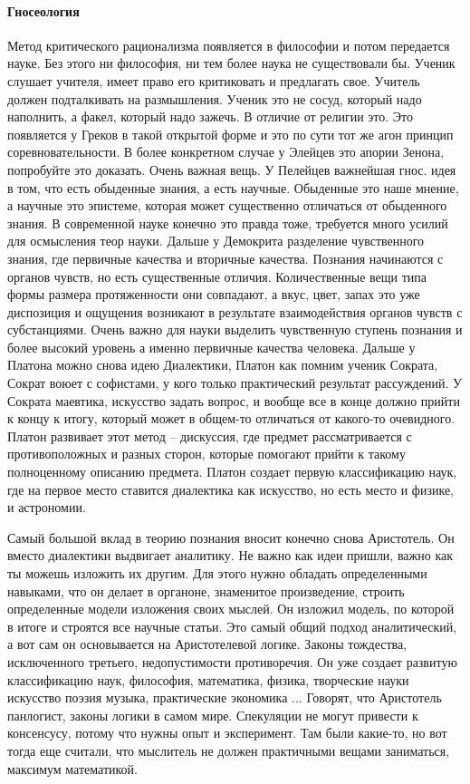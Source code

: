 \documentclass[a4paper, 12pt]{article}
\begin{document}
\paragraph{Гносеология}
Метод критического рационализма появляется в философии и потом 
передается науке. Без этого ни философия, ни тем более наука не 
существовали бы. Ученик слушает учителя, имеет право его критиковать 
и предлагать свое. Учитель должен подталкивать на размышления. Ученик 
это не сосуд, который надо наполнить, а факел, который надо зажечь. 
В отличие от религии это. Это появляется у Греков в такой открытой форме 
и это по сути тот же агон принцип соревновательности. В более конкретном 
случае у Элейцев это апории Зенона, попробуйте это доказать. Очень 
важная вещь. У Пелейцев важнейшая гнос. идея в том, что есть обыденные 
знания, а есть научные. Обыденные это наше мнение, а научные это 
эпистеме, которая может существенно отличаться от обыденного знания. 
В современной науке конечно это правда тоже, требуется много усилий для 
осмысления теор науки. Дальше у Демокрита разделение чувственного 
знания, где первичные качества и вторичные качества. Познания начинаются 
с органов чувств, но есть существенные отличия. Количественные вещи типа 
формы размера протяженности они совпадают, а вкус, цвет, запах это уже 
диспозиция и ощущения возникают в результате взаимодействия органов 
чувств с субстанциями. Очень важно для науки выделить чувственную 
ступень познания и более высокий уровень а именно первичные качества 
человека. Дальше у Платона можно снова идею Диалектики, Платон как 
помним ученик Сократа, Сократ воюет с софистами, у кого только 
практический результат рассуждений. У Сократа маевтика, искусство задать 
вопрос, и вообще все в конце должно прийти к концу к итогу, который 
может в общем-то отличаться от какого-то очевидного. Платон развивает 
этот метод -- дискуссия, где предмет рассматривается с противоположных 
и разных сторон, которые помогают прийти к такому полноценному описанию 
предмета. Платон создает первую классификацию наук, где на первое место 
ставится диалектика как искусство, но есть место и физике, и астрономии.

Самый большой вклад в теорию познания вносит конечно снова Аристотель. 
Он вместо диалектики выдвигает аналитику. Не важно как идеи пришли, 
важно как ты можешь изложить их другим. Для этого нужно обладать 
определенными навыками, что он делает в органоне, знаменитое 
произведение, строить определенные модели изложения своих мыслей. Он 
изложил модель, по которой в итоге и строятся все научные статьи. Это 
самый общий подход аналитический, а вот сам он основывается на 
Аристотелевой логике. Законы тождества, исключенного третьего, 
недопустимости противоречия. Он уже создает развитую классификацию наук, 
философия, математика, физика, творческие науки искусство поэзия музыка, 
практические экономика ... Говорят, что Аристотель панлогист, законы 
логики в самом мире. Спекуляции не могут привести к консенсусу, потому 
что нужны опыт и эксперимент. Там были какие-то, но вот тогда еще 
считали, что мыслитель не должен практичными вещами заниматься, максимум 
математикой.
\end{document}
